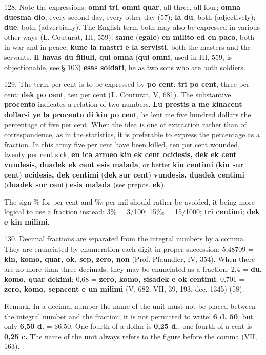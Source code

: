 128. Note the expressions: \textbf{omni tri}, \textbf{omni quar}, all three, all four; \textbf{omna duesma dio}, every second day, every other day (57); \textbf{la du}, both (adjectively); \textbf{due}, both (adverbially). The English term both may also be expressed in various other ways (L. Couturat, III, 559): \textbf{same }(\textbf{egale})\textbf{ en milito ed en paco}, both in war and in peace; \textbf{kune la mastri e la servisti}, both the masters and the servants. \textbf{Il havas du filiuli, qui omna }(\textbf{qui omni}, used in III, 559, is objectionable, see § 103)\textbf{ esas soldati}, he as two sons who are both soldiers.

129. The term per cent is to be expressed by \textbf{po cent}: \textbf{tri po cent}, three per cent; \textbf{dek po cent}, ten per cent (L. Couturat, V, 681). The substantive \textbf{procento} indicates a relation of two numbers. \textbf{Lu prestis a me kinacent dollar-i ye la procento di kin po cent}, he lent me five hundred dollars the percentage of five per cent. When the idea is one of extraction rather than of correspondence, as in the statistics, it is preferable to express the percentage as a fraction. In this army five per cent have been killed, ten per cent wounded, twenty per cent sick, \textbf{en ica armeo kin ek cent ocidesis, dek ek cent vundesis, duadek ek cent esis malada}, or better \textbf{kin centimi }(\textbf{kin sur cent})\textbf{ ocidesis, dek centimi }(\textbf{dek sur cent})\textbf{ vundesis, duadek centimi }(\textbf{duadek sur cent})\textbf{ esis malada} (see prepos. \textbf{ek}).

The sign \% for per cent and ‰ per mil should rather be avoided, it being more logical to use a fraction instead: 3\% = 3/100; 15‰ = 15/1000; \textbf{tri centimi}; \textbf{dek e kin milimi}.

130. Decimal fractions are separated from the integral numbers by a comma. They are enunciated by enumeration each digit in proper succession: 5,48709 = \textbf{kin, komo, quar, ok, sep, zero, non} (Prof. Pfaundler, IV, 354). When there are no more than three decimals, they may be enunciated as a fraction: 2,4 = \textbf{du, komo, quar dekimi}; 0,68 = \textbf{zero, komo, sisadek e ok centimi}; 0,701 = \textbf{zero, komo, sepacent e un milimi} (V, 682; VII, 39, 193, dec. 1345) (58).

\small Remark. In a decimal number the name of the unit must not be placed between the integral number and the fraction; it is not permitted to write: \textbf{6 d. 50}, but only \textbf{6,50 d.} = \$6.50. One fourth of a dollar is \textbf{0,25 d.}; one fourth of a cent is \textbf{0,25 c.} The name of the unit always refers to the figure before the comma (VII, 163). \normalsize

